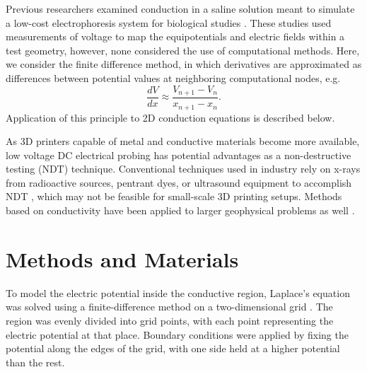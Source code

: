 \documentclass[10pt,journal,twoside]{IEEEtran} %
\begin{document}
Previous researchers examined conduction in a saline solution meant to simulate a low-cost electrophoresis system for biological studies \cite{ayyagari:2024:computational,baru:2024:demonstrating,cohen:2024:visualizing,edwards:2024:electric,kumar:2024:mapping}. These studies used measurements of voltage to map the equipotentials and electric fields within a test geometry, however, none considered the use of computational methods. Here, we consider the finite difference method, in which derivatives are approximated as differences between potential values at neighboring computational nodes, e.g. 
\begin{equation}
\dfrac{dV}{dx} \approx \dfrac{V_{n+1}-V_n}{x_{n+1}-x_n}.
\end{equation}
Application of this principle to 2D conduction equations is described below. 

As 3D printers capable of metal and conductive materials become more available, low voltage DC electrical probing has potential advantages as a non-destructive testing (NDT) technique. Conventional techniques used in industry rely on x-rays from radioactive sources, pentrant dyes, or ultrasound equipment to accomplish NDT \cite{davis:2004:nondestructive,cawley:2001:nondestructive}, which may not be feasible for small-scale 3D printing setups. Methods based on conductivity have been applied to larger geophysical problems as well \cite{loke:2013:recent}. 





\section{Methods and Materials}
To model the electric potential inside the conductive region, Laplace’s equation was solved using a finite-difference method on a two-dimensional grid \cite{press:1992:numerical}. The region was evenly divided into grid points, with each point representing the electric potential at that place. Boundary conditions were applied by fixing the potential along the edges of the grid, with one side held at a higher potential than the rest.
\end{document}
